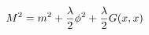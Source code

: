 \begin{equation}
\label{undici}
M^2=  m^2 + {\lambda \over 2} \phi^2  + {\lambda \over 2} G(x,x)
\end{equation}

